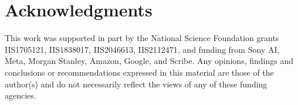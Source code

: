 \section{Acknowledgments}

This work was supported in part by the National Science Foundation grants IIS1705121, IIS1838017, IIS2046613, IIS2112471, and funding from Sony AI, Meta, Morgan Stanley, Amazon, Google, and Scribe. Any opinions, findings and conclusions or recommendations expressed in this material are those of the author(s) and do not necessarily reflect the views of any of these funding agencies.
